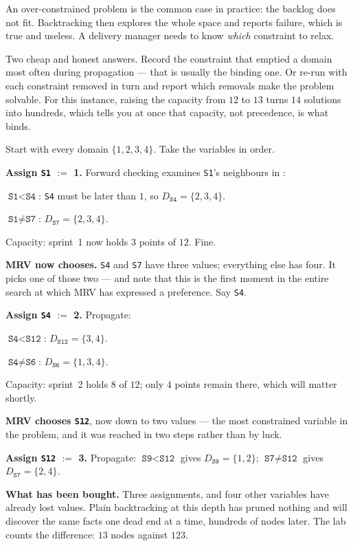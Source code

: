An over-constrained problem is the common case in practice: the backlog does not
fit. Backtracking then explores the whole space and reports failure, which is true
and useless. A delivery manager needs to know \emph{which} constraint to relax.

Two cheap and honest answers. Record the constraint that emptied a domain most
often during propagation --- that is usually the binding one. Or re-run with each
constraint removed in turn and report which removals make the problem solvable.
For this instance, raising the capacity from $12$ to $13$ turns $14$ solutions into
hundreds, which tells you at once that capacity, not precedence, is what binds.

\begin{worked}
Start with every domain $\{1,2,3,4\}$. Take the variables in order.

\smallskip
\textbf{Assign \texttt{S1} $:=$ 1.} Forward checking examines \texttt{S1}'s
neighbours in :
\begin{tight}
  \item $\texttt{S1} < \texttt{S4}$: \texttt{S4} must be later than $1$, so
        $D_{\texttt{S4}} = \{2,3,4\}$.
  \item $\texttt{S1} \ne \texttt{S7}$: $D_{\texttt{S7}} = \{2,3,4\}$.
\end{tight}
Capacity: sprint~1 now holds $3$ points of $12$. Fine.

\smallskip
\textbf{MRV now chooses.} \texttt{S4} and \texttt{S7} have three values; everything
else has four. It picks one of those two --- and note that this is the first moment
in the entire search at which MRV has expressed a preference. Say \texttt{S4}.

\smallskip
\textbf{Assign \texttt{S4} $:=$ 2.} Propagate:
\begin{tight}
  \item $\texttt{S4} < \texttt{S12}$: $D_{\texttt{S12}} = \{3,4\}$.
  \item $\texttt{S4} \ne \texttt{S6}$: $D_{\texttt{S6}} = \{1,3,4\}$.
\end{tight}
Capacity: sprint~2 holds $8$ of $12$; only $4$ points remain there, which will
matter shortly.

\smallskip
\textbf{MRV chooses \texttt{S12}}, now down to two values --- the most constrained
variable in the problem, and it was reached in two steps rather than by luck.

\smallskip
\textbf{Assign \texttt{S12} $:=$ 3.} Propagate:
$\texttt{S9} < \texttt{S12}$ gives $D_{\texttt{S9}} = \{1,2\}$;
$\texttt{S7} \ne \texttt{S12}$ gives $D_{\texttt{S7}} = \{2,4\}$.

\smallskip
\textbf{What has been bought.} Three assignments, and four other variables have
already lost values. Plain backtracking at this depth has pruned nothing and will
discover the same facts one dead end at a time, hundreds of nodes later. The lab
counts the difference: $13$ nodes against $123$.
\end{worked}

